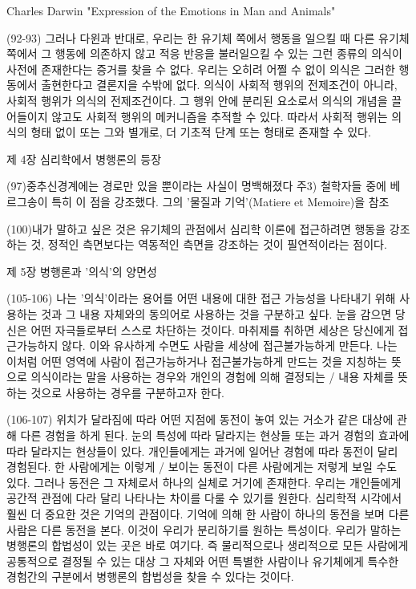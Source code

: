 \documentclass[12pt, a4paper]{article}
\begin{document}
Charles Darwin "Expression of the Emotions in Man and Animals"

(92-93) 그러나 다윈과 반대로, 우리는 한 유기체 쪽에서 행동을 일으킬 때 다른 유기체 쪽에서 그 행동에 의존하지 않고 적응 반응을 불러일으킬 수 있는 그런 종류의 의식이 사전에 존재한다는 증거를 찾을 수 없다. 우리는 오히려 어쩔 수 없이 의식은 그러한 행동에서 출현한다고 결론지을 수밖에 없다. 의식이 사회적 행위의 전제조건이 아니라, 사회적 행위가 의식의 전제조건이다. 그 행위 안에 분리된 요소로서 의식의 개념을 끌어들이지 않고도 사회적 행위의 메커니즘을 추적할 수 있다. 따라서 사회적 행위는 의식의 형태 없이 또는 그와 별개로, 더 기초적 단계 또는 형태로 존재할 수 있다.



제 4장 심리학에서 병행론의 등장

(97)중추신경계에는 경로만 있을 뿐이라는 사실이 명백해졌다
주3) 철학자들 중에 베르그송이 특히 이 점을 강조했다. 그의 '물질과 기억'(Matiere et Memoire)을 참조

(100)내가 말하고 싶은 것은 유기체의 관점에서 심리학 이론에 접근하려면 행동을 강조하는 것, 정적인 측면보다는 역동적인 측면을 강조하는 것이 필연적이라는 점이다.



제 5장 병행론과 '의식'의 양면성

(105-106) 나는 '의식'이라는 용어를 어떤 내용에 대한 접근 가능성을 나타내기 위해 사용하는 것과 그 내용 자체와의 동의어로 사용하는 것을 구분하고 싶다. 눈을 감으면 당신은 어떤 자극들로부터 스스로 차단하는 것이다. 마취제를 취하면 세상은 당신에게 접근가능하지 않다. 이와 유사하게 수면도 사람을 세상에 접근불가능하게 만든다. 나는 이처럼 어떤 영역에 사람이 접근가능하거나 접근불가능하게 만드는 것을 지칭하는 뜻으로 의식이라는 말을 사용하는 경우와 개인의 경험에 의해 결정되는 / 내용 자체를 뜻하는 것으로 사용하는 경우를 구분하고자 한다.

(106-107) 위치가 달라짐에 따라 어떤 지점에 동전이 놓여 있는 거소가 같은 대상에 관해 다른 경험을 하게 된다. 눈의 특성에 따라 달라지는 현상들 또는 과거 경험의 효과에 따라 달라지는 현상들이 있다. 개인들에게는 과거에 일어난 경험에 따라 동전이 달리 경험된다. 한 사람에게는 이렇게 / 보이는 동전이 다른 사람에게는 저렇게 보일 수도 있다. 그러나 동전은 그 자체로서 하나의 실체로 거기에 존재한다. 우리는 개인들에게 공간적 관점에 다라 달리 나타나는 차이를 다룰 수 있기를 원한다. 심리학적 시각에서 훨씬 더 중요한 것은 기억의 관점이다. 기억에 의해 한 사람이 하나의 동전을 보며 다른 사람은 다른 동전을 본다. 이것이 우리가 분리하기를 원하는 특성이다. 우리가 말하는 병행론의 합법성이 있는 곳은 바로 여기다. 즉 물리적으로나 생리적으로 모든 사람에게 공통적으로 결정될 수 있는 대상 그 자체와 어떤 특별한 사람이나 유기체에게 특수한 경험간의 구분에서 병행론의 합법성을 찾을 수 있다는 것이다.
\end{document}
